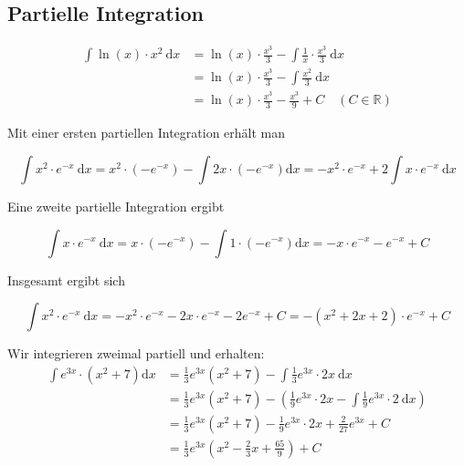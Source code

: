 \subsection*{Partielle Integration}

\begin{example}
$$
\begin{aligned}
\int \ln (x) \cdot x^{2} \mathrm{~d} x & =\ln (x) \cdot \frac{x^{3}}{3}-\int \frac{1}{x} \cdot \frac{x^{3}}{3} \mathrm{~d} x \\
& =\ln (x) \cdot \frac{x^{3}}{3}-\int \frac{x^{2}}{3} \mathrm{~d} x \\
& =\ln (x) \cdot \frac{x^{3}}{3}-\frac{x^{3}}{9}+C \quad(C \in \mathbb{R})
\end{aligned}
$$

\end{example}

\begin{example}
    Mit einer ersten partiellen Integration erhält man

$$
\int x^{2} \cdot e^{-x} \mathrm{~d} x=x^{2} \cdot\left(-e^{-x}\right)-\int 2 x \cdot\left(-e^{-x}\right) \mathrm{d} x=-x^{2} \cdot e^{-x}+2 \int x \cdot e^{-x} \mathrm{~d} x
$$

Eine zweite partielle Integration ergibt

$$
\int x \cdot e^{-x} \mathrm{~d} x=x \cdot\left(-e^{-x}\right)-\int 1 \cdot\left(-e^{-x}\right) \mathrm{d} x=-x \cdot e^{-x}-e^{-x}+C
$$

Insgesamt ergibt sich

$$
\int x^{2} \cdot e^{-x} \mathrm{~d} x=-x^{2} \cdot e^{-x}-2 x \cdot e^{-x}-2 e^{-x}+C=-\left(x^{2}+2 x+2\right) \cdot e^{-x}+C
$$
\end{example}


\begin{example}
    Wir integrieren zweimal partiell und erhalten:
    $$
\begin{aligned}
\int e^{3 x} \cdot\left(x^{2}+7\right) \mathrm{d} x & =\frac{1}{3} e^{3 x}\left(x^{2}+7\right)-\int \frac{1}{3} e^{3 x} \cdot 2 x \mathrm{~d} x \\
& =\frac{1}{3} e^{3 x}\left(x^{2}+7\right)-\left(\frac{1}{9} e^{3 x} \cdot 2 x-\int \frac{1}{9} e^{3 x} \cdot 2 \mathrm{~d} x\right) \\
& =\frac{1}{3} e^{3 x}\left(x^{2}+7\right)-\frac{1}{9} e^{3 x} \cdot 2 x+\frac{2}{27} e^{3 x}+C \\
& =\frac{1}{3} e^{3 x}\left(x^{2}-\frac{2}{3} x+\frac{65}{9}\right)+C
\end{aligned}
$$
\end{example}

